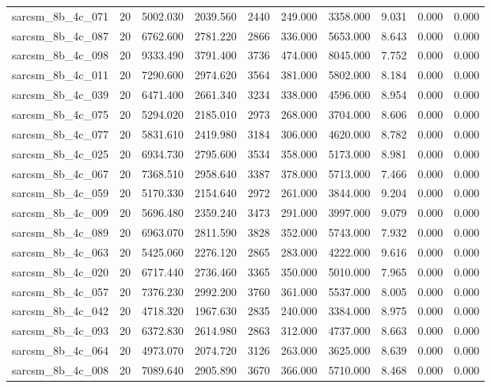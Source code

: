\begin{tabular}{lrrrrrrrrr}
sarcsm\_8b\_4c\_071 & 20 & 5002.030 & 2039.560 & 2440 & 249.000 & 3358.000 & 9.031 & 0.000 & 0.000 \\
sarcsm\_8b\_4c\_087 & 20 & 6762.600 & 2781.220 & 2866 & 336.000 & 5653.000 & 8.643 & 0.000 & 0.000 \\
sarcsm\_8b\_4c\_098 & 20 & 9333.490 & 3791.400 & 3736 & 474.000 & 8045.000 & 7.752 & 0.000 & 0.000 \\
sarcsm\_8b\_4c\_011 & 20 & 7290.600 & 2974.620 & 3564 & 381.000 & 5802.000 & 8.184 & 0.000 & 0.000 \\
sarcsm\_8b\_4c\_039 & 20 & 6471.400 & 2661.340 & 3234 & 338.000 & 4596.000 & 8.954 & 0.000 & 0.000 \\
sarcsm\_8b\_4c\_075 & 20 & 5294.020 & 2185.010 & 2973 & 268.000 & 3704.000 & 8.606 & 0.000 & 0.000 \\
sarcsm\_8b\_4c\_077 & 20 & 5831.610 & 2419.980 & 3184 & 306.000 & 4620.000 & 8.782 & 0.000 & 0.000 \\
sarcsm\_8b\_4c\_025 & 20 & 6934.730 & 2795.600 & 3534 & 358.000 & 5173.000 & 8.981 & 0.000 & 0.000 \\
sarcsm\_8b\_4c\_067 & 20 & 7368.510 & 2958.640 & 3387 & 378.000 & 5713.000 & 7.466 & 0.000 & 0.000 \\
sarcsm\_8b\_4c\_059 & 20 & 5170.330 & 2154.640 & 2972 & 261.000 & 3844.000 & 9.204 & 0.000 & 0.000 \\
sarcsm\_8b\_4c\_009 & 20 & 5696.480 & 2359.240 & 3473 & 291.000 & 3997.000 & 9.079 & 0.000 & 0.000 \\
sarcsm\_8b\_4c\_089 & 20 & 6963.070 & 2811.590 & 3828 & 352.000 & 5743.000 & 7.932 & 0.000 & 0.000 \\
sarcsm\_8b\_4c\_063 & 20 & 5425.060 & 2276.120 & 2865 & 283.000 & 4222.000 & 9.616 & 0.000 & 0.000 \\
sarcsm\_8b\_4c\_020 & 20 & 6717.440 & 2736.460 & 3365 & 350.000 & 5010.000 & 7.965 & 0.000 & 0.000 \\
sarcsm\_8b\_4c\_057 & 20 & 7376.230 & 2992.200 & 3760 & 361.000 & 5537.000 & 8.005 & 0.000 & 0.000 \\
sarcsm\_8b\_4c\_042 & 20 & 4718.320 & 1967.630 & 2835 & 240.000 & 3384.000 & 8.975 & 0.000 & 0.000 \\
sarcsm\_8b\_4c\_093 & 20 & 6372.830 & 2614.980 & 2863 & 312.000 & 4737.000 & 8.663 & 0.000 & 0.000 \\
sarcsm\_8b\_4c\_064 & 20 & 4973.070 & 2074.720 & 3126 & 263.000 & 3625.000 & 8.639 & 0.000 & 0.000 \\
sarcsm\_8b\_4c\_008 & 20 & 7089.640 & 2905.890 & 3670 & 366.000 & 5710.000 & 8.468 & 0.000 & 0.000 \\

\end{tabular}
